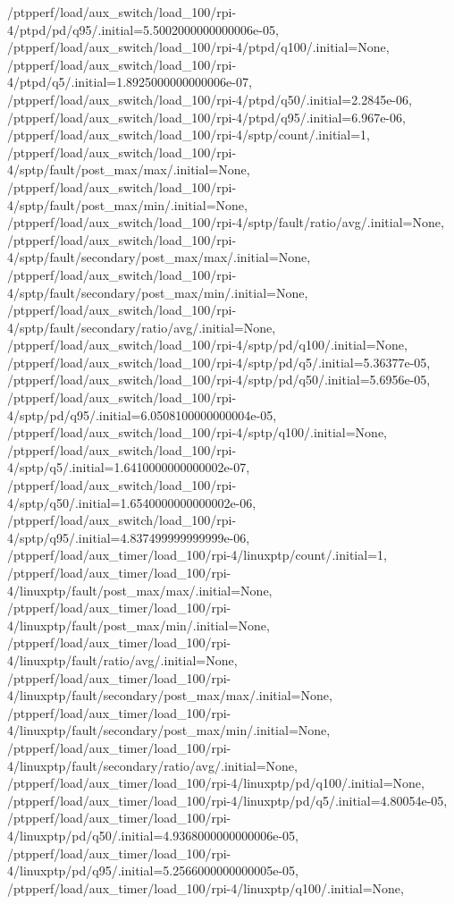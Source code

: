 {    /ptpperf/load/aux_switch/load_100/rpi-4/ptpd/pd/q95/.initial=5.5002000000000006e-05,
    /ptpperf/load/aux_switch/load_100/rpi-4/ptpd/q100/.initial=None,
    /ptpperf/load/aux_switch/load_100/rpi-4/ptpd/q5/.initial=1.8925000000000006e-07,
    /ptpperf/load/aux_switch/load_100/rpi-4/ptpd/q50/.initial=2.2845e-06,
    /ptpperf/load/aux_switch/load_100/rpi-4/ptpd/q95/.initial=6.967e-06,
    /ptpperf/load/aux_switch/load_100/rpi-4/sptp/count/.initial=1,
    /ptpperf/load/aux_switch/load_100/rpi-4/sptp/fault/post_max/max/.initial=None,
    /ptpperf/load/aux_switch/load_100/rpi-4/sptp/fault/post_max/min/.initial=None,
    /ptpperf/load/aux_switch/load_100/rpi-4/sptp/fault/ratio/avg/.initial=None,
    /ptpperf/load/aux_switch/load_100/rpi-4/sptp/fault/secondary/post_max/max/.initial=None,
    /ptpperf/load/aux_switch/load_100/rpi-4/sptp/fault/secondary/post_max/min/.initial=None,
    /ptpperf/load/aux_switch/load_100/rpi-4/sptp/fault/secondary/ratio/avg/.initial=None,
    /ptpperf/load/aux_switch/load_100/rpi-4/sptp/pd/q100/.initial=None,
    /ptpperf/load/aux_switch/load_100/rpi-4/sptp/pd/q5/.initial=5.36377e-05,
    /ptpperf/load/aux_switch/load_100/rpi-4/sptp/pd/q50/.initial=5.6956e-05,
    /ptpperf/load/aux_switch/load_100/rpi-4/sptp/pd/q95/.initial=6.0508100000000004e-05,
    /ptpperf/load/aux_switch/load_100/rpi-4/sptp/q100/.initial=None,
    /ptpperf/load/aux_switch/load_100/rpi-4/sptp/q5/.initial=1.6410000000000002e-07,
    /ptpperf/load/aux_switch/load_100/rpi-4/sptp/q50/.initial=1.6540000000000002e-06,
    /ptpperf/load/aux_switch/load_100/rpi-4/sptp/q95/.initial=4.837499999999999e-06,
    /ptpperf/load/aux_timer/load_100/rpi-4/linuxptp/count/.initial=1,
    /ptpperf/load/aux_timer/load_100/rpi-4/linuxptp/fault/post_max/max/.initial=None,
    /ptpperf/load/aux_timer/load_100/rpi-4/linuxptp/fault/post_max/min/.initial=None,
    /ptpperf/load/aux_timer/load_100/rpi-4/linuxptp/fault/ratio/avg/.initial=None,
    /ptpperf/load/aux_timer/load_100/rpi-4/linuxptp/fault/secondary/post_max/max/.initial=None,
    /ptpperf/load/aux_timer/load_100/rpi-4/linuxptp/fault/secondary/post_max/min/.initial=None,
    /ptpperf/load/aux_timer/load_100/rpi-4/linuxptp/fault/secondary/ratio/avg/.initial=None,
    /ptpperf/load/aux_timer/load_100/rpi-4/linuxptp/pd/q100/.initial=None,
    /ptpperf/load/aux_timer/load_100/rpi-4/linuxptp/pd/q5/.initial=4.80054e-05,
    /ptpperf/load/aux_timer/load_100/rpi-4/linuxptp/pd/q50/.initial=4.9368000000000006e-05,
    /ptpperf/load/aux_timer/load_100/rpi-4/linuxptp/pd/q95/.initial=5.2566000000000005e-05,
    /ptpperf/load/aux_timer/load_100/rpi-4/linuxptp/q100/.initial=None,
}
